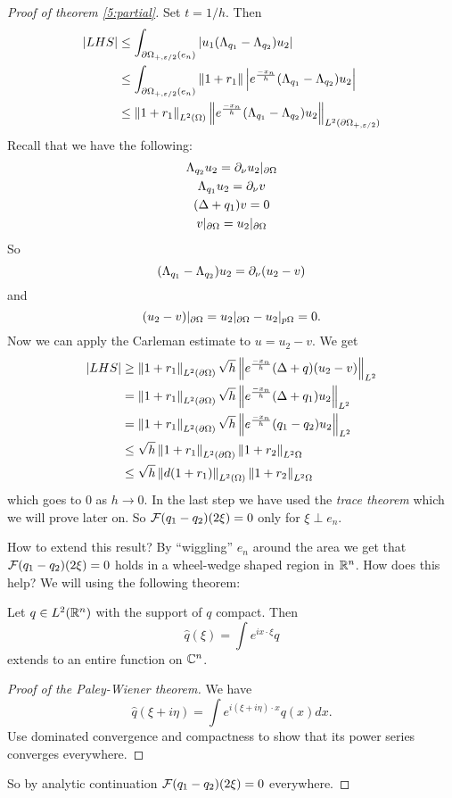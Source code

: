 \begin{proof}[Proof of theorem \ref{5:partial}]
  Set $t=1/h$.
  Then
  \begin{align*}
    \left\lvert LHS \right\rvert &\leq \int_{\partial\Omega_{+,\varepsilon/2}(e_n)} \left\lvert u_1(\Lambda_{q_1}-\Lambda_{q_2})u_2 \right\rvert \\
    &\leq \int_{\partial\Omega_{+,\varepsilon/2}(e_n)} \left\lVert 1+r_1 \right\rVert \left\lvert e^\frac{-x_n}h(\Lambda_{q_1}-\Lambda_{q_2})u_2 \right\rvert \\
    &\leq \left\lVert 1+r_1 \right\rVert_{L^2(\Omega)} \left\lVert e^\frac{-x_n}h(\Lambda_{q_1}-\Lambda_{q_2})u_2 \right\rVert_{L^2(\partial\Omega_{+,\varepsilon/2})} \\
  \end{align*}
  Recall that we have the following:
  \begin{gather*}
    \Lambda_{q_2}u_2 = \partial_\nu u_2|_{\partial\Omega} \\
    \Lambda_{q_1}u_2 = \partial_\nu v \\
    (\Delta+q_1)v=0 \\
    v|_{\partial\Omega} = u_2|_{\partial\Omega}
  \end{gather*}
  So
  \[ (\Lambda_{q_1}-\Lambda_{q_2})u_2 = \partial_\nu (u_2-v) \]
  and
  \[ (u_2-v)|_{\partial\Omega} = u_2|_{\partial\Omega} - u_2|_{p\Omega} = 0. \]
  Now we can apply the Carleman estimate to $u=u_2-v$.
  We get
  \begin{align*}
    \left\lvert LHS \right\rvert &\geq \left\lVert 1+r_1 \right\rVert_{L^2(\partial\Omega)} \sqrt{h} \left\lVert e^\frac{-x_n}h (\Delta+q)(u_2-v) \right\rVert_{L^2} \\
     &= \left\lVert 1+r_1 \right\rVert_{L^2(\partial\Omega)} \sqrt{h} \left\lVert e^\frac{-x_n}h (\Delta+q_1)u_2 \right\rVert_{L^2} \\
     &= \left\lVert 1+r_1 \right\rVert_{L^2(\partial\Omega)} \sqrt{h} \left\lVert e^\frac{-x_n}h (q_1-q_2)u_2 \right\rVert_{L^2} \\
     &\leq \sqrt{h} \left\lVert 1+r_1 \right\rVert_{L^2(\partial\Omega)}\left\lVert 1+r_2 \right\rVert_{L^2{\Omega}} \\
     &\leq \sqrt{h} \left\lVert d(1+r_1) \right\rVert_{L^2(\Omega)}\left\lVert 1+r_2 \right\rVert_{L^2{\Omega}}
  \end{align*}
  which goes to $0$ as $h \to 0$.
  In the last step we have used the \emph{trace theorem} which we will prove later on.
  So $\mathcal{F}(q_1-q_2)(2\xi)=0$ only for $\xi\perp e_n$.

  How to extend this result?
  By ``wiggling'' $e_n$ around the area we get that $\mathcal{F}(q_1-q_2)(2\xi)=0$ holds in a wheel-wedge shaped region in $\mathbb{R}^n$.
  How does this help?
  We will using the following theorem:

  \begin{thm}
    Let $q \in L^2(\mathbb{R}^n)$ with the support of $q$ compact.
    Then
    \[ \hat q(\xi) = \int e^{ix\cdot\xi} q \]
    extends to an entire function on $\mathbb{C}^n$.
  \end{thm}

  \begin{proof}[Proof of the Paley-Wiener theorem]
    We have
    \[ \hat q(\xi+i\eta) = \int e^{i(\xi+i\eta)\cdot x} q(x) dx. \]
    Use dominated convergence and compactness to show that its power series converges everywhere.
  \end{proof}

  So by analytic continuation $\mathcal{F}(q_1-q_2)(2\xi)=0$ everywhere.
\end{proof}

